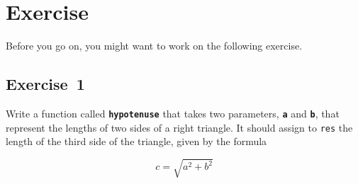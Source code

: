 \section{Exercise}

Before you go on, you might want to work on the following exercise.
\subsection{Exercise~1}
\label{hypotenuse_exercise}
Write a function called \textbf{\lstinline{hypotenuse}} that takes two parameters, \textbf{\lstinline{a}} and \textbf{\lstinline{b}}, that represent the lengths of two sides of a right triangle.  It should assign to \lstinline{res} the length of the third side of the triangle, given by the formula

\[ c = \sqrt{a^2 + b^2} \]

